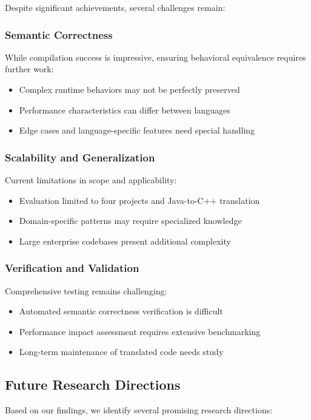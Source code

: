 Despite significant achievements, several challenges remain:

\subsubsection{Semantic Correctness}
While compilation success is impressive, ensuring behavioral equivalence requires further work:
\begin{itemize}
\item Complex runtime behaviors may not be perfectly preserved
\item Performance characteristics can differ between languages
\item Edge cases and language-specific features need special handling
\end{itemize}

\subsubsection{Scalability and Generalization}
Current limitations in scope and applicability:
\begin{itemize}
\item Evaluation limited to four projects and Java-to-C++ translation
\item Domain-specific patterns may require specialized knowledge
\item Large enterprise codebases present additional complexity
\end{itemize}

\subsubsection{Verification and Validation}
Comprehensive testing remains challenging:
\begin{itemize}
\item Automated semantic correctness verification is difficult
\item Performance impact assessment requires extensive benchmarking
\item Long-term maintenance of translated code needs study
\end{itemize}

\subsection{Future Research Directions}

Based on our findings, we identify several promising research directions:

